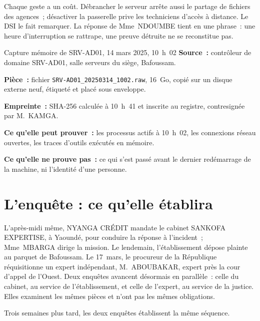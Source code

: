 Chaque geste a un coût. Débrancher le serveur arrête aussi le partage de
fichiers des agences~; désactiver la passerelle prive les techniciens
d'accès à distance. Le DSI le fait remarquer. La réponse de Mme~NDOUMBE tient
en une phrase~: une heure d'interruption se rattrape, une preuve détruite
ne se reconstitue pas.

\begin{boxobjet}{Capture mémoire de SRV-AD01, 14 mars 2025, 10~h~02}
\textbf{Source~:} contrôleur de domaine SRV-AD01, salle serveurs du siège,
Bafoussam.

\textbf{Pièce~:} fichier \texttt{SRV-AD01\_20250314\_1002.raw}, 16~Go,
copié sur un disque externe neuf, étiqueté et placé sous enveloppe.

\textbf{Empreinte~:} SHA-256 calculée à 10~h~41 et inscrite au registre,
contresignée par M.~KAMGA.

\textbf{Ce qu'elle peut prouver~:} les processus actifs à 10~h~02, les
connexions réseau ouvertes, les traces d'outils exécutés en mémoire.

\textbf{Ce qu'elle ne prouve pas~:} ce qui s'est passé avant le dernier
redémarrage de la machine, ni l'identité d'une personne.
\end{boxobjet}

\section{L'enquête : ce qu'elle établira}
\label{sec:p00-enquete}

L'après-midi même, NYANGA CRÉDIT mandate le cabinet SANKOFA EXPERTISE, à
Yaoundé, pour conduire la réponse à l'incident~; Mme~MBARGA dirige la
mission. Le lendemain, l'établissement dépose plainte au parquet de
Bafoussam. Le 17~mars, le procureur de la République réquisitionne un expert
indépendant, M.~ABOUBAKAR, expert près la cour d'appel de l'Ouest. Deux
enquêtes avancent désormais en parallèle~: celle du cabinet, au service de
l'établissement, et celle de l'expert, au service de la justice. Elles
examinent les mêmes pièces et n'ont pas les mêmes obligations.

Trois semaines plus tard, les deux enquêtes établissent la même séquence.

